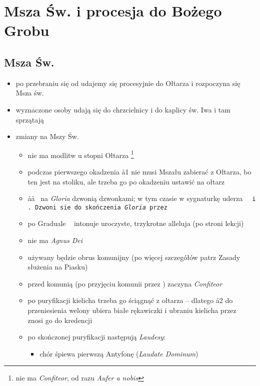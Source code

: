 \section{Msza Św. i procesja do Bożego Grobu}

\subsection{Msza Św.}

\begin{itemize}
	\item po przebraniu się od udajemy się procesyjnie do Ołtarza i rozpoczyna
	      się Msza św.
	\item wyznaczone osoby udają się do chrzcielnicy i do kaplicy św. Iwa i tam
	      sprzątają
	\item zmiany na Mszy Św.
	      \begin{itemize}
		      \item nie ma modlitw u stopni Ołtarza \footnote{nie ma \textit{Confiteor},
			            od razu \textit{Aufer a nobis}}
		      \item podczas pierwszego okadzenia \aa1 nie musi Mszału zabierać z Ołtarza,
		            bo ten jest na stoliku, ale trzeba go po okadzeniu ustawić na ołtarz
		      \item \aa\aa~ na \textit{Gloria} dzwonią dzwonkami; w tym czasie w
		            sygnaturkę uderza \tt~ i \zz. Dzwoni sie do skończenia
		            \textit{Gloria}	przez \ii
		      \item po Graduale \ii~ intonuje uroczyste, trzykrotne alleluja
		            (po stroni lekcji)
		      \item nie ma \textit{Agnus Dei}
		      \item używany będzie obrus komunijny (po więcej szczegółów patrz
		            Zasady służenia na Piasku) 
		      \item przed komunią (po przyjęciu komunii przez \ii)  zaczyna
		            \textit{Confiteor}
		      \item po puryfikacji kielicha trzeba go ściągnąć z ołtarza -- dlatego
		            \aa2 do przeniesienia welony ubiera białe rękawiczki i ubraniu
		            kielicha przez \ii~ znosi go do kredencji
		      \item po skończonej puryfikacji następują \textit{Laudesy}:
		            \begin{itemize}
			            \item chór śpiewa pierwszą Antyfonę (\textit{Laudate Dominum})

\end{itemize}
\end{itemize}
\end{itemize}
